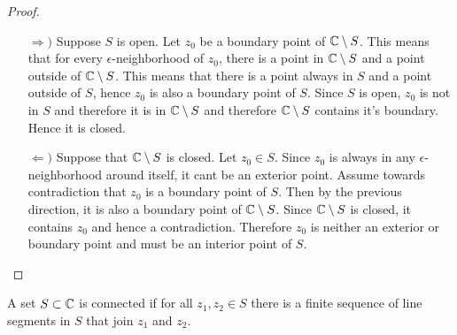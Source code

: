 \documentclass[../notes.tex]{subfiles}
\begin{document}
\begin{proof}
    \hfill\begin{enumerate}
        \item[$\Rightarrow)$] %
        Suppose $S$ is open. Let $z_0$ be a boundary point of $\mathbb{C} \setminus S$. This means that for every $\epsilon$-neighborhood of $z_0$, there is a point in $\mathbb{C} \setminus S$ and a point outside of $\mathbb{C} \setminus S$. This means that there is a point always in $S$ and a point outside of $S$, hence $z_0$ is also a boundary point of $S$. Since $S$ is open, $z_0$ is not in $S$ and therefore it is in $\mathbb{C} \setminus S$ and therefore $\mathbb{C} \setminus S$ contains it's boundary. Hence it is closed.
        \item[$\Leftarrow)$] %
        Suppose that $\mathbb{C} \setminus S$ is closed. Let $z_0 \in S$. Since $z_0$ is always in any $\epsilon$-neighborhood around itself, it cant be an exterior point. Assume towards contradiction that $z_0$ is a boundary point of $S$. Then by the previous direction, it is also a boundary point of $\mathbb{C} \setminus S$. Since $\mathbb{C} \setminus S$ is closed, it contains $z_0$ and hence a contradiction. Therefore $z_0$ is neither an exterior or boundary point and must be an interior point of $S$.
    \end{enumerate}
\end{proof}

\begin{definition}[Connectedness]
    A set $S \subset \mathbb{C}$ is connected if for all $z_1, z_2 \in S$ there is a finite sequence of line segments in $S$ that join $z_1$ and $z_2$.
\end{definition}
\end{document}
